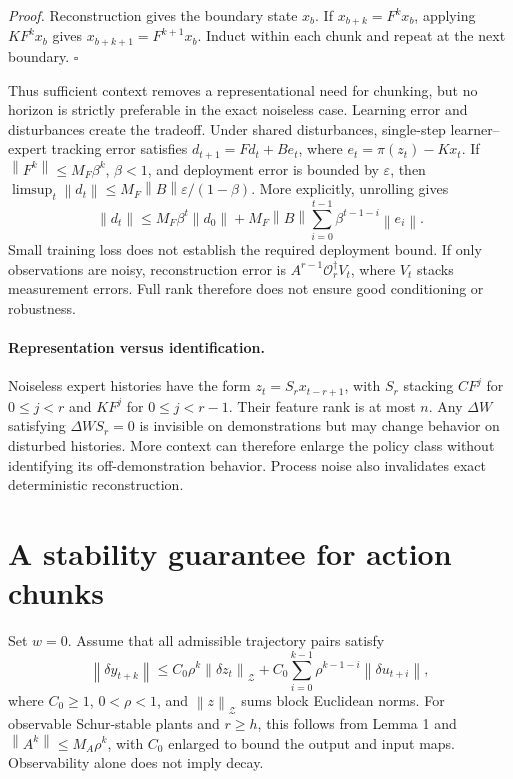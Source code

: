\documentclass[11pt]{article}
\newcommand{\norm}[1]{\left\lVert#1\right\rVert}
\begin{document}
\emph{Proof.} Reconstruction gives the boundary state $x_b$. If $x_{b+k}=F^kx_b$, applying $KF^kx_b$ gives $x_{b+k+1}=F^{k+1}x_b$. Induct within each chunk and repeat at the next boundary. $\square$

Thus sufficient context removes a representational need for chunking, but no horizon is strictly preferable in the exact noiseless case. Learning error and disturbances create the tradeoff. Under shared disturbances, single-step learner--expert tracking error satisfies $d_{t+1}=Fd_t+Be_t$, where $e_t=\hat\pi(z_t)-Kx_t$. If $\norm{F^k}\le M_F\beta^k$, $\beta<1$, and deployment error is bounded by $\varepsilon$, then $\limsup_t\norm{d_t}\le M_F\norm{B}\varepsilon/(1-\beta)$. More explicitly, unrolling gives
\[
\norm{d_t}\le M_F\beta^t\norm{d_0}
+M_F\norm{B}\sum_{i=0}^{t-1}\beta^{t-1-i}\norm{e_i}.
\]
Small training loss does not establish the required deployment bound. If only observations are noisy, reconstruction error is $A^{r-1}\mathcal O_r^\dagger V_t$, where $V_t$ stacks measurement errors. Full rank therefore does not ensure good conditioning or robustness.

\paragraph{Representation versus identification.}
Noiseless expert histories have the form $z_t=S_rx_{t-r+1}$, with $S_r$ stacking $CF^j$ for $0\le j<r$ and $KF^j$ for $0\le j<r-1$. Their feature rank is at most $n$. Any $\Delta W$ satisfying $\Delta WS_r=0$ is invisible on demonstrations but may change behavior on disturbed histories. More context can therefore enlarge the policy class without identifying its off-demonstration behavior. Process noise also invalidates exact deterministic reconstruction.

\section{A stability guarantee for action chunks}
Set $w=0$. Assume that all admissible trajectory pairs satisfy
\begin{equation}
\norm{\delta y_{t+k}}\le C_0\rho^k\norm{\delta z_t}_{\mathcal Z}
+C_0\sum_{i=0}^{k-1}\rho^{k-1-i}\norm{\delta u_{t+i}},
\label{eq:ios}
\end{equation}
where $C_0\ge1$, $0<\rho<1$, and $\norm{z}_{\mathcal Z}$ sums block Euclidean norms. For observable Schur-stable plants and $r\ge h$, this follows from Lemma 1 and $\norm{A^k}\le M_A\rho^k$, with $C_0$ enlarged to bound the output and input maps. Observability alone does not imply decay.
\end{document}
